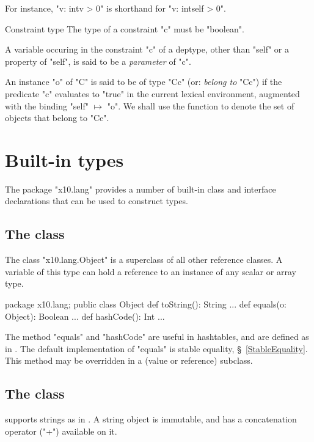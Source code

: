 For instance, \xcd"v: int{v > 0}" is shorthand for \xcd"v: int{self > 0}".

\begin{staticrule}{Constraint type}
  The type of a constraint \xcd"c" must be \xcd"boolean".  
\end{staticrule}

A variable occuring in the constraint \xcd"c" of a deptype, other than
\xcd"self" or a property of \xcd"self", is said to be a {\em
parameter} of \xcd"c".\label{DepType:Parameter} 

An instance \xcd"o" of \xcd"C" is said to be of type \xcd"C{c}"
(or: {\em belong to}
\xcd"C{c}") if the predicate \xcd"c" evaluates to \xcd"true" in the current lexical
environment, augmented with the binding \xcd"self" $\mapsto$ \xcd"o". We shall
use the function  to denote the set of
objects that belong to \xcd"C{c}". 



\section{Built-in types}

The package \xcd"x10.lang" provides a number of built-in class and
interface declarations that can be used to construct types.

\subsection{The class }\label{Object}
The class \xcd"x10.lang.Object" is a superclass of all other reference classes.
A variable of this type can hold a reference to an instance of any
scalar or array type.

\begin{xten}
package x10.lang;
public class Object {
  def toString(): String {...}
  def equals(o: Object): Boolean {...}
  def hashCode(): Int {...}
}
\end{xten}

The method \xcd"equals" and \xcd"hashCode" are useful in hashtables,
and are defined as in \java. The default implementation of \xcd"equals"
is stable equality, \S~\ref{StableEquality}. This method may be overridden
in a (value or reference) subclass.

\subsection{The class }
\Xten{} supports strings as in \java{}. A string object is immutable,
and has a concatenation operator (\xcd"+")  available on it.

